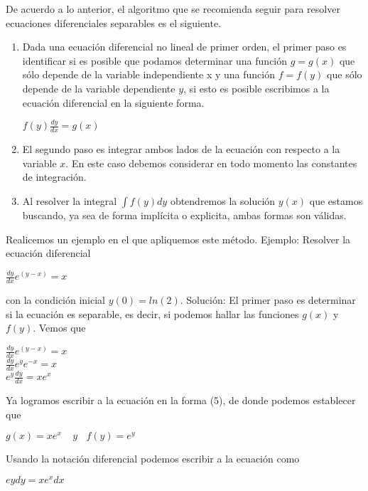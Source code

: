 \documentclass[l etterpaper,11pt]{article}
\begin{document}
De acuerdo a lo anterior, el algoritmo que se recomienda seguir para resolver ecuaciones diferenciales separables es el siguiente.
\begin{enumerate}
\item  Dada una ecuación diferencial no lineal de primer orden, el primer paso es identificar si es posible que podamos determinar una función $g=g(x)$ que sólo depende de la variable independiente x y una función $f=f(y)$ que sólo depende de la variable dependiente $y$, si esto es posible escribimos a la ecuación diferencial en la siguiente forma.
\begin {center}
$f(y)\frac{dy}{dx}=g(x)$\\
\end {center}

\item  El segundo paso es integrar ambos lados de la ecuación con respecto a la variable $x$. En este caso debemos considerar en todo momento las constantes de integración.
\item  Al resolver la integral $\int f(y)dy$ obtendremos la solución $y(x)$ que estamos buscando, ya sea de forma implícita o explicita, ambas formas son válidas.
\end{enumerate}

Realicemos un ejemplo en el que apliquemos este método.
Ejemplo: Resolver la ecuación diferencial
\begin{center}
$\frac{dy}{dx}e^{(y-x)}=x$\\
\end{center}

con la condición inicial $ y(0)=ln{\left(2\right)}.$
Solución: El primer paso es determinar si la ecuación es separable, es decir, si podemos hallar las funciones $  g(x)$ y $f(y)$. Vemos que

\begin{center}
$\frac{dy}{dx}e^{(y-x)}=x$\\
$\frac{dy}{dx}e^ye^{-x}=x$\\
$e^y\frac{dy}{dx}=xe^x$\\
\end{center}

Ya logramos escribir a la ecuación en la forma (5), de donde podemos establecer que
\begin{center}
$g(x)=xe^x\ \ \ \ \ y\ \ \ \ f(y)=e^y$\\
\end{center}

Usando la notación diferencial podemos escribir a la ecuación como
\begin {center}
$eydy=xe^xdx$\\
\end {center}
\end{document}
